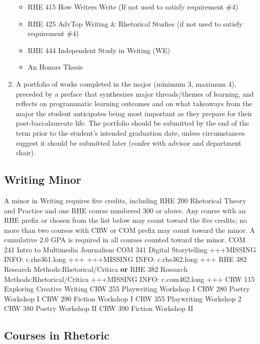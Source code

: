 \documentclass[
  letterpaper,
]{scrbook}
\providecommand{\tightlist}{%
  \setlength{\itemsep}{0pt}\setlength{\parskip}{0pt}}
\begin{document}
\begin{enumerate}
  \begin{itemize}
  \tightlist
  \item
    RHE 415 How Writers Write (If not used to satisfy requirement \#4)
  \item
    RHE 425 AdvTop Writing \& Rhetorical Studies (if not used to satisfy
    requirement \#4)
  \item
    RHE 444 Independent Study in Writing (WE)
  \item
    An Honors Thesis
  \end{itemize}
\item
  A portfolio of works completed in the major (minimum 3, maximum 4),
  preceded by a preface that synthesizes major threads/themes of
  learning, and reflects on programmatic learning outcomes and on what
  takeaways from the major the student anticipates being most important
  as they prepare for their post-baccalaureate life. The portfolio
  should be submitted by the end of the term prior to the student's
  intended graduation date, unless circumstances suggest it should be
  submitted later (confer with advisor and department chair).
\end{enumerate}

\subsection{Writing Minor}\label{writing-minor}

A minor in Writing requires five credits, including RHE 200 Rhetorical
Theory and Practice and one RHE course numbered 300 or above. Any course
with an RHE prefix or chosen from the list below may count toward the
five credits; no more than two courses with CRW or COM prefix may count
toward the minor. A cumulative 2.0 GPA is required in all courses
counted toward the minor. COM 241 Intro to Multimedia Journalism COM 341
Digital Storytelling +++MISSING INFO: c.rhe361.long +++ +++MISSING INFO:
c.rhe362.long +++ RHE 382 Research Methods:Rhetorical/Critica
\textbf{or} RHE 382 Research Methods:Rhetorical/Critica +++MISSING INFO:
c.com462.long +++ CRW 115 Exploring Creative Writing CRW 255 Playwriting
Workshop I CRW 280 Poetry Workshop I CRW 290 Fiction Workshop I CRW 355
Playwriting Workshop 2 CRW 380 Poetry Workshop II CRW 390 Fiction
Workshop II

\subsection{Courses in Rhetoric}\label{courses-in-rhetoric}
\end{document}
